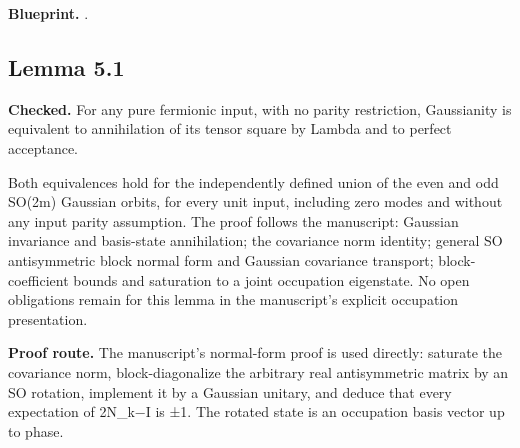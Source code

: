 \textbf{Blueprint.} .

\subsection{Lemma 5.1}\label{paper:r5-1}
\textbf{Checked.} For any pure fermionic input, with no parity restriction, Gaussianity is equivalent to annihilation of its tensor square by Lambda and to perfect acceptance. 

Both equivalences hold for the independently defined union of the even and odd SO(2m) Gaussian orbits, for every unit input, including zero modes and without any input parity assumption. The proof follows the manuscript: Gaussian invariance and basis-state annihilation; the covariance norm identity; general SO antisymmetric block normal form and Gaussian covariance transport; block-coefficient bounds and saturation to a joint occupation eigenstate. No open obligations remain for this lemma in the manuscript's explicit occupation presentation.

\textbf{Proof route.} The manuscript's normal-form proof is used directly: saturate the covariance norm, block-diagonalize the arbitrary real antisymmetric matrix by an SO rotation, implement it by a Gaussian unitary, and deduce that every expectation of 2N\_k−I is ±1. The rotated state is an occupation basis vector up to phase.


